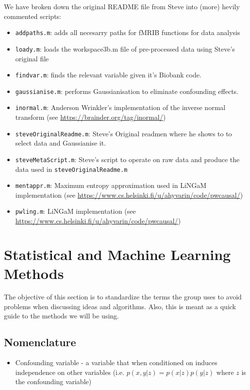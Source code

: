 \documentclass{article}
\begin{document}
We have broken down the original README file from Steve into (more) hevily commented scripts:
\begin{itemize}
\item {\tt addpaths.m}: adds all necesarry paths for fMRIB functions for data analysis
\item {\tt loady.m}: loads the workspace3b.m file of pre-processed data using Steve's original file
\item {\tt findvar.m}: finds the relevant variable given it's Biobank code.
\item {\tt gaussianise.m}: performs Gaussianisation to eliminate confounding effects.
\item {\tt inormal.m}: Anderson Wrinkler's implementation of the inverse normal transform (see \url{https://brainder.org/tag/inormal/})
\item {\tt steveOriginalReadme.m}: Steve's Original readmen where he shows to to select data and Gaussianise it.
\item {\tt steveMetaScript.m}: Steve's script to operate on raw data and produce the data used in {\tt steveOriginalReadme.m}
\item {\tt mentappr.m}: Maximum entropy approximation used in LiNGaM implementation (see \url{https://www.cs.helsinki.fi/u/ahyvarin/code/pwcausal/})
\item {\tt pwling.m}: LiNGaM implementation (see \url{https://www.cs.helsinki.fi/u/ahyvarin/code/pwcausal/})
\end{itemize}

\section{Statistical and Machine Learning Methods\label{sec:methods}}

The objective of this section is to standardize the terms the group uses to avoid problems when discussing ideas and algorithms. Also, this is meant as a quick guide to the methods we will be using.

\subsection{Nomenclature\label{sec:method-nomen}}
\begin{itemize}
\item Confounding variable - a variable that when conditioned on induces independence on other variables (i.e. $p(x,y|z) = p(x|z)p(y|z)$ where $z$ is the confounding variable)
\end{itemize}
\end{document}
